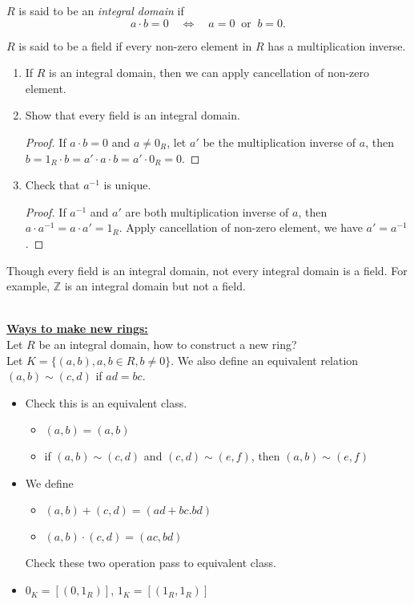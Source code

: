 \documentclass{mynotes}
\begin{document}
\begin{definition}
$R$ is said to be an \emph{integral domain}  if 
$$a\cdot b =0\quad\Longleftrightarrow\quad a=0\ \mbox{ or }\ b=0.$$
\end{definition}
\begin{definition}
$R$ is said to be a field if every non-zero element in $R$ has a multiplication inverse.
\end{definition}
\begin{exercise}\mbox{}
\begin{enumerate}
\item If $R$ is an integral domain, then we can apply cancellation of non-zero element.
\item Show that every field is an integral domain.
\begin{proof}
If $a\cdot b = 0$ and $a\neq 0_R$, let $a'$ be the multiplication inverse of $a$, then $b=1_R \cdot b=a'\cdot a\cdot b =a'\cdot0_R=0$.
\end{proof}
\item Check that $a^{-1}$ is unique.
\begin{proof}
If $a^{-1}$ and $a'$ are both multiplication inverse of $a$, then $a\cdot a^{-1} = a\cdot a' =1_R$. Apply cancellation of non-zero element, we have $a' = a^{-1}$.
\end{proof}
\end{enumerate}
\end{exercise}
\begin{remark}Though every field is an integral domain, not every integral domain is a field. For example, $\mathbb{Z}$ is an integral domain but not a field.
\end{remark}\mbox{}\\
\underline{\bfseries Ways to make new rings:}\\[1pt]
Let $R$ be an integral domain, how to construct a new ring?\\
Let $K=\{(a,b), a,b\in R, b\neq 0\}$. We also define an equivalent relation $(a,b)\sim(c,d)$ if $ad=bc$.
\begin{itemize}
\item Check this is an equivalent class.
\begin{itemize}
\item $(a,b)=(a,b)$
\item if $(a,b)\sim (c,d)$ and $(c,d)\sim (e,f)$, then $(a,b)\sim (e,f)$
\end{itemize}
\item We define \begin{itemize}
 \item $(a,b)+(c, d) = (ad+bc. bd)$
 \item $(a,b)\cdot (c,d) = (ac, bd)$
 \end{itemize}
 Check these two operation pass to equivalent class.
\item $0_K=[(0,1_R)]$, $1_K = [(1_R, 1_R)]$
\end{itemize}
\end{document}
